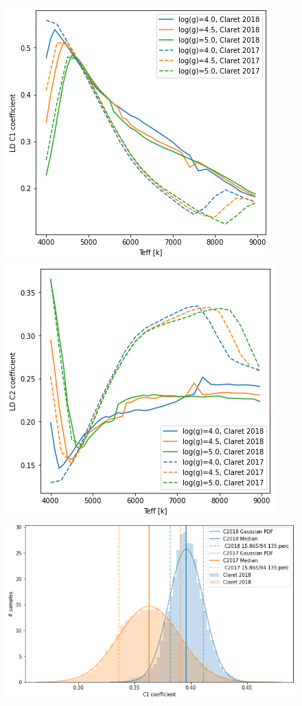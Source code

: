 \documentclass{aa}
\begin{document}
\begin{figure}[H]
    \centering  
    \includegraphics[scale=0.4, angle=0]{pictures/c1.png}
    \includegraphics[scale=0.4, angle=0]{pictures/c2.png}
    \includegraphics[scale=0.35, angle=0]{pictures/c1_comp.png}

\end{figure}
\end{document}
